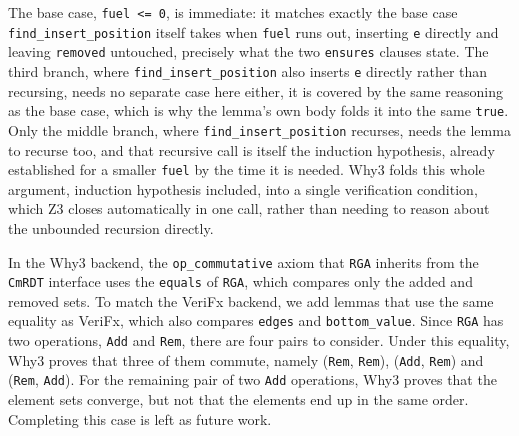 The base case, \texttt{fuel <= 0}, is immediate: it matches exactly the base case \texttt{find\_insert\_position} itself
takes when \texttt{fuel} runs out, inserting \texttt{e} directly and leaving \texttt{removed} untouched, precisely what
the two \texttt{ensures} clauses state. The third branch, where \texttt{find\_insert\_position} also inserts \texttt{e}
directly rather than recursing, needs no separate case here either, it is covered by the same reasoning as the base case,
which is why the lemma's own body folds it into the same \texttt{true}. Only the middle branch, where
\texttt{find\_insert\_position} recurses, needs the lemma to recurse too, and that recursive call is itself the
induction hypothesis, already established for a smaller \texttt{fuel} by the time it is needed. Why3 folds this whole
argument, induction hypothesis included, into a single verification condition, which Z3 closes automatically in one call,
rather than needing to reason about the unbounded recursion directly.

In the Why3 backend, the \texttt{op\_commutative} axiom that \texttt{RGA} inherits from the \texttt{CmRDT} interface uses
the \texttt{equals} of \texttt{RGA}, which compares only the added and removed sets. To match the VeriFx backend, we add
lemmas that use the same equality as VeriFx, which also compares \texttt{edges} and \texttt{bottom\_value}. Since
\texttt{RGA} has two operations, \texttt{Add} and \texttt{Rem}, there are four pairs to consider. Under this equality,
Why3 proves that three of them commute, namely (\texttt{Rem}, \texttt{Rem}), (\texttt{Add}, \texttt{Rem}) and (\texttt{Rem},
\texttt{Add}). For the remaining pair of two \texttt{Add} operations, Why3 proves that the element sets converge, but not
that the elements end up in the same order. Completing this case is left as future work.
